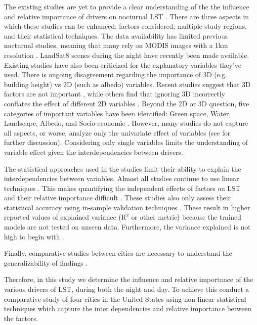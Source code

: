\documentclass[]{elsarticle}
\begin{document}
The existing studies are yet to provide a clear understanding of the the influence and relative importance of drivers on nocturnal LST \cite{Chun2017-mm, Echevarria_Icaza2016-fr, Wicki2017-fv, Zhou2014-wc }. 
There are three aspects in which these studies can be enhanced: factors considered, multiple study regions, and their statistical techniques.
The data availability has limited previous nocturnal studies, meaning that many rely on MODIS images with a 1km resolution \cite{}.
LandSat8 scenes during the night have recently been made available. 
Existing studies have also been criticized for the explanatory variables they've used.
There is ongoing disagreement regarding the importance of 3D (e.g. building height) vs 2D (such as albedo) variables.  
Recent studies suggest that 3D factors are not important \cite{Berger2017-lx}, while others find that ignoring 3D incorrectly conflates the effect of different 2D variables \cite{Chun2017-mm}.
Beyond the 2D or 3D question, five categories of important variables have been identified: Green space, Water, Landscape, Albedo, and Socio-economic \cite{Peng2018-cp}. However, many studies do not capture all aspects, or worse, analyze only the univariate effect of variables \cite{Zhao2017-cc, Merbitz2012-xz, Unger2004-ry} (see \cite{Peng2018-cp, Chun2017-mm} for further discussion). Considering only single variables limits the understanding of variable effect given the interdependencies between drivers.

The statistical approaches used in the studies limit their ability to explain the interdependencies between variables. 
Almost all studies continue to use linear techniques \cite{Li2017-yl, etc.}. 
This makes quantifying the independent effects of factors on LST and their relative importance difficult \cite{Peng2018-cp, Zhou2014-wc}.
These studies also only assess their statistical accuracy using in-sample validation techniques \cite{something about validation e.g. Schmuli}.
These result in higher reported values of explained variance (R$^2$ or other metric) because the trained models are not tested on unseen data.
Furthermore, the variance explained is not high to begin with \cite{Chun2017-mm}.

Finally, comparative studies between cities are necessary to understand the generalizability of findings \cite{Peng2012-iy, Hung2006-qy}.

Therefore, in this study we determine the influence and relative importance of the various drivers of LST, during both the night and day. 
To achieve this conduct a comparative study of four cities in the United States using non-linear statistical techniques which capture the inter dependencies and relative importance between the factors.
\end{document}
